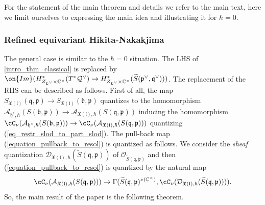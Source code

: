 \documentclass[12pt]{amsart}
\begin{document}



  For the statement of the main theorem and details we refer to the main text, here we limit ourselves to expressing the main idea and illustrating it for $\hbar=0$. 
    
\subsubsection{Refined equivariant Hikita-Nakakjima}
The general case is similar to the $\hbar=0$ situation. The LHS of \cref{intro_thm_classical} is replaced by $\on{Im}(H^*_{Z_{L^\vee} \times \mathbb{C}^{\times}}(T^*\mathcal{Q}^\vee) \rightarrow H^*_{Z_{L^\vee} \times \mathbb{C}^\times}(\widetilde{S}(\mathfrak{p}^\vee,\mathfrak{q}^\vee)))$. The replacement of the RHS can be described as follows. First of all, the map $S_{\mathfrak{X}(\mathfrak{l})}(\mathfrak{q},\mathfrak{p}) \rightarrow  S_{\mathfrak{X}(\mathfrak{l})}(\mathfrak{b},\mathfrak{p})$ quantizes to the homomorphism $\mathcal{A}_{\mathfrak{h}^*,\hbar}(S(\mathfrak{b},\mathfrak{p})) \rightarrow \mathcal{A}_{\mathfrak{X}(\mathfrak{l}),\hbar}(S(\mathfrak{q},\mathfrak{p}))$ inducing the homomorphism $\cC_\nu(\mathcal{A}_{\mathfrak{h}^*,\hbar}(S(\mathfrak{b},\mathfrak{p}))) \rightarrow \cC_\nu(\mathcal{A}_{\mathfrak{X}(\mathfrak{l}),\hbar}(S(\mathfrak{q},\mathfrak{p})))$ quantizing (\ref{eq_restr_slod_to_part_slod}). The pull-back map (\ref{equation_pullback_to_resol}) is quantized as follows. We consider the {\emph{sheaf}} quantization $\mathcal{D}_{\mathfrak{X}(\mathfrak{l}),\hbar}(\widetilde{S}(\mathfrak{q},\mathfrak{p}))$ of $\mathcal{O}_{\widetilde{S}(\mathfrak{q},\mathfrak{p})}$ and then (\ref{equation_pullback_to_resol}) is quantized by the natural map 
\begin{equation*}
\cC_\nu(\mathcal{A}_{\mathfrak{X}(\mathfrak{l}),\hbar}(S(\mathfrak{q},\mathfrak{p}))) \rightarrow \Gamma(\widetilde{S}(\mathfrak{q},\mathfrak{p})^{\nu(\mathbb{C}^\times)},\cC_\nu(\mathcal{D}_{\mathfrak{X}(\mathfrak{l}),\hbar}(\widetilde{S}(\mathfrak{q},\mathfrak{p})))).
\end{equation*}
So, the main result of the paper is the following theorem.
\end{document}
